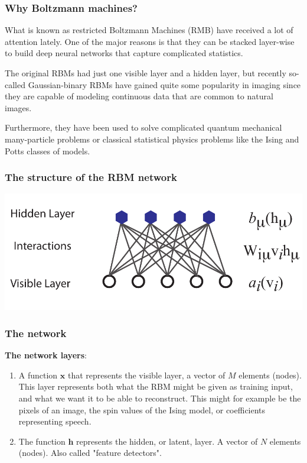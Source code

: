 \documentclass{beamer}
\begin{document}
\begin{frame}
\frametitle{Why Boltzmann machines?}

What is known as restricted Boltzmann Machines (RMB) have received a
lot of attention lately.  One of the major reasons is that they can be
stacked layer-wise to build deep neural networks that capture
complicated statistics.

The original RBMs had just one visible layer and a hidden layer, but
recently so-called Gaussian-binary RBMs have gained quite some
popularity in imaging since they are capable of modeling continuous
data that are common to natural images.

Furthermore, they have been used to solve complicated quantum
mechanical many-particle problems or classical statistical physics
problems like the Ising and Potts classes of models.
\end{frame}

\begin{frame}
\frametitle{The structure of the RBM network}

\vspace{6mm}

\centerline{\includegraphics[width=1.0\linewidth]{figures/RBM.pdf}}

\vspace{6mm}
\end{frame}

\begin{frame}
\frametitle{The network}

\textbf{The network layers}:
\begin{enumerate}
 \item A function $\mathbf{x}$ that represents the visible layer, a vector of $M$ elements (nodes). This layer represents both what the RBM might be given as training input, and what we want it to be able to reconstruct. This might for example be the pixels of an image, the spin values of the Ising model, or coefficients representing speech.

 \item The function $\mathbf{h}$ represents the hidden, or latent, layer. A vector of $N$ elements (nodes). Also called "feature detectors".
\end{enumerate}

\noindent
\end{frame}
\end{document}
